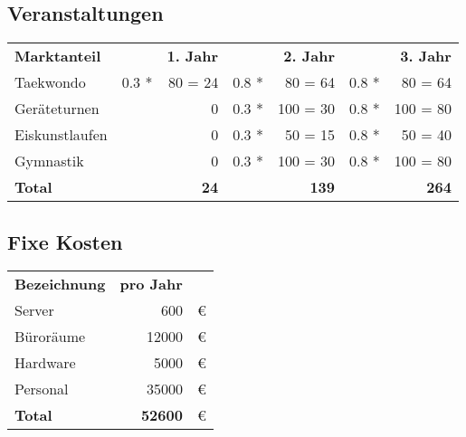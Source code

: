 \subsection{Veranstaltungen}

\begin{table}[H]

    \begin{tabular}{l r r r r r r}
        \textbf{Marktanteil}	& &\textbf{1. Jahr}  & &\textbf{2. Jahr}  & & \textbf{3. Jahr} \\
        Taekwondo               & 0.3 *& 80 = 24     & 0.8 * & 80 = 64    & 0.8 *&  80 = 64\\
        Geräteturnen            & &0                 & 0.3 *& 100 = 30    & 0.8 *& 100 = 80\\
        Eiskunstlaufen          & &0                 & 0.3 *&  50 = 15    & 0.8 *&  50 = 40\\
        Gymnastik               & &0                 & 0.3 *& 100 = 30    & 0.8 *& 100 = 80\\
        \midrule
        \textbf{Total}          & &\textbf{24}  & & \textbf{139}   &   & \textbf{264}
    \end{tabular}
    \label{tab:veranstaltungen}
\end{table}

\subsection{Fixe Kosten}

\begin{table}[H]

    \begin{tabular}{l r l}
        \textbf{Bezeichnung}    & \textbf{pro Jahr} & \\
        Server                  & 600               & €\\
        Büroräume               & 12000             & €\\
        Hardware                & 5000              & €\\
        Personal                & 35000             & €\\
        \midrule
        \textbf{Total}          & \textbf{52600}    & €\\
    \end{tabular}
    \label{tab:Fixkosten}
\end{table}

